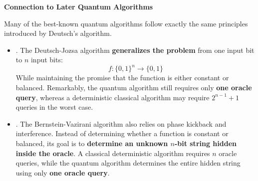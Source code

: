 \highspace
\begin{flushleft}
    \textcolor{Green3}{ \textbf{Connection to Later Quantum Algorithms}}
\end{flushleft}
Many of the best-known quantum algorithms follow exactly the same principles introduced by Deutsch's algorithm.
\begin{itemize}
    \item {}. The Deutsch-Jozsa algorithm \textbf{generalizes the problem} from one input bit to $n$ input bits:
    \begin{equation*}
        f : \{0,1\}^n \to \{0,1\}
    \end{equation*}
    While maintaining the promise that the function is either constant or balanced. Remarkably, the quantum algorithm still requires only \textbf{one oracle query}, whereas a deterministic classical algorithm may require $2^{n-1}+1$ queries in the worst case.


    \item {}. The Bernstein-Vazirani algorithm also relies on phase kickback and interference. Instead of determining whether a function is constant or balanced, its goal is to \textbf{determine an unknown $n$-bit string hidden inside the oracle}. A classical deterministic algorithm requires $n$ oracle queries, while the quantum algorithm determines the entire hidden string using only \textbf{one oracle query}.
\end{itemize}